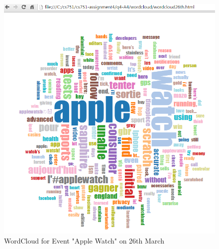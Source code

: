 \documentclass[12pt]{Report}
\begin{document}
\begin{figure}[ht]    
    \begin{center}
        \includegraphics[scale=0.60]{word26th.png}
        \caption{WordCloud for Event "Apple Watch" on 26th March }
        \label{WordCloud for Event "Apple Watch" on 26th March}
    \end{center}
\end{figure}
\end{document}

